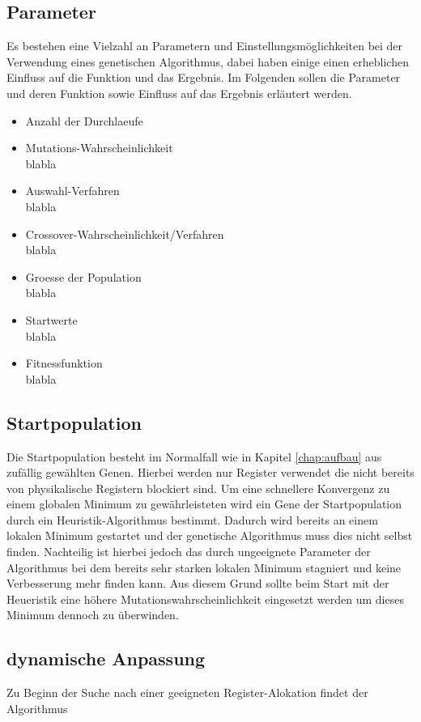 \subsection{Parameter}
Es bestehen eine Vielzahl an Parametern und Einstellungsmöglichkeiten bei der Verwendung eines genetischen Algorithmus, dabei haben einige einen erheblichen Einfluss auf die Funktion und das Ergebnis. Im Folgenden sollen die Parameter und deren Funktion sowie Einfluss auf das Ergebnis erläutert werden.
\begin{itemize}
	\item Anzahl der Durchlaeufe\\
	
	\item Mutations-Wahrscheinlichkeit\\
	blabla
	\item Auswahl-Verfahren\\
	blabla
	\item Crossover-Wahrscheinlichkeit/Verfahren\\
	blabla
	\item Groesse der Population\\
	blabla
	\item Startwerte\\
	blabla
	\item Fitnessfunktion\\
	blabla
\end{itemize}
 
\subsection{Startpopulation}
Die Startpopulation besteht im Normalfall wie in Kapitel \ref{chap:aufbau} aus zufällig gewählten Genen. Hierbei werden nur Register verwendet die nicht bereits von physikalische Registern blockiert sind.
Um eine schnellere Konvergenz zu einem globalen Minimum zu gewährleisteten wird ein Gene der Startpopulation durch ein Heuristik-Algorithmus bestimmt. Dadurch wird bereits an einem lokalen Minimum gestartet und der genetische Algorithmus muss dies nicht selbst finden. 
Nachteilig ist hierbei jedoch das durch ungeeignete Parameter der Algorithmus bei dem bereits sehr starken lokalen Minimum stagniert und keine Verbesserung mehr finden kann. Aus diesem Grund sollte beim Start mit der Heueristik eine höhere Mutationswahrscheinlichkeit eingesetzt werden um dieses Minimum dennoch zu überwinden.

\subsection{dynamische Anpassung}
Zu Beginn der Suche nach einer geeigneten Register-Alokation findet der Algorithmus
\newpage
